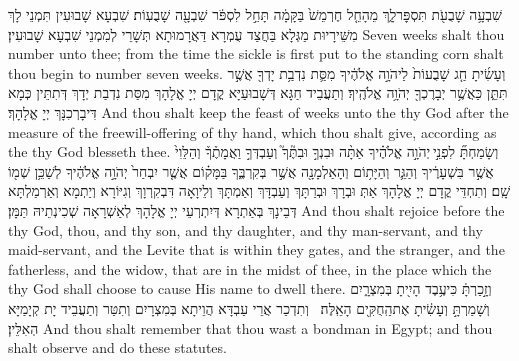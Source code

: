 {שִׁבְעָ֥ה שָׁבֻעֹ֖ת תִּסְפׇּר\maqqaf לָ֑ךְ מֵהָחֵ֤ל חֶרְמֵשׁ֙ בַּקָּמָ֔ה תָּחֵ֣ל לִסְפֹּ֔ר שִׁבְעָ֖ה שָׁבֻעֽוֹת׃}
{שִׁבְעָא שָׁבוּעִין תִּמְנֵי לָךְ מִשֵּׁירָיוּת מַגְּלָא בַּחֲצַד עֻמְרָא דַּאֲרָמוּתָא תְּשָׁרֵי לְמִמְנֵי שִׁבְעָא שָׁבוּעִין׃}
{Seven weeks shalt thou number unto thee; from the time the sickle is first put to the standing corn shalt thou begin to number seven weeks.}{}
{וְעָשִׂ֜יתָ חַ֤ג שָׁבֻעוֹת֙ לַיהֹוָ֣ה אֱלֹהֶ֔יךָ מִסַּ֛ת נִדְבַ֥ת יָדְךָ֖ אֲשֶׁ֣ר תִּתֵּ֑ן כַּאֲשֶׁ֥ר יְבָרֶכְךָ֖ יְהֹוָ֥ה אֱלֹהֶֽיךָ׃}
{וְתַעֲבֵיד חַגָּא דְּשָׁבוּעַיָּא קֳדָם יְיָ אֱלָהָךְ מִסַּת נִדְבַת יְדָךְ דְּתִתֵּין כְּמָא דִּיבָרְכִנָּךְ יְיָ אֱלָהָךְ׃}
{And thou shalt keep the feast of weeks unto the \lord\space thy God after the measure of the freewill-offering of thy hand, which thou shalt give, according as the \lord\space thy God blesseth thee.}{}
{וְשָׂמַחְתָּ֞ לִפְנֵ֣י \legarmeh  יְהֹוָ֣ה אֱלֹהֶ֗יךָ אַתָּ֨ה וּבִנְךָ֣ וּבִתֶּ֘ךָ֮ וְעַבְדְּךָ֣ וַאֲמָתֶ֒ךָ֒ וְהַלֵּוִי֙ אֲשֶׁ֣ר בִּשְׁעָרֶ֔יךָ וְהַגֵּ֛ר וְהַיָּת֥וֹם וְהָאַלְמָנָ֖ה אֲשֶׁ֣ר בְּקִרְבֶּ֑ךָ בַּמָּק֗וֹם אֲשֶׁ֤ר יִבְחַר֙ יְהֹוָ֣ה אֱלֹהֶ֔יךָ לְשַׁכֵּ֥ן שְׁמ֖וֹ שָֽׁם׃}
{וְתִחְדֵּי קֳדָם יְיָ אֱלָהָךְ אַתְּ וּבְרָךְ וּבְרַתָּךְ וְעַבְדָּךְ וְאַמְתָּךְ וְלֵיוָאָה דִּבְקִרְוָךְ וְגִיּוֹרָא וְיַתְמָא וְאַרְמַלְתָּא דְּבֵינָךְ בְּאַתְרָא דְּיִתְרְעֵי יְיָ אֱלָהָךְ לְאַשְׁרָאָה שְׁכִינְתֵיהּ תַּמָּן׃}
{And thou shalt rejoice before the \lord\space thy God, thou, and thy son, and thy daughter, and thy man-servant, and thy maid-servant, and the Levite that is within they gates, and the stranger, and the fatherless, and the widow, that are in the midst of thee, in the place which the \lord\space thy God shall choose to cause His name to dwell there.}{}
{וְזָ֣כַרְתָּ֔ כִּי\maqqaf עֶ֥בֶד הָיִ֖יתָ בְּמִצְרָ֑יִם וְשָׁמַרְתָּ֣ וְעָשִׂ֔יתָ אֶת\maqqaf הַֽחֻקִּ֖ים הָאֵֽלֶּה׃ \petucha }
{וְתִדְכַר אֲרֵי עַבְדָּא הֲוֵיתָא בְּמִצְרָיִם וְתִטַּר וְתַעֲבֵיד יָת קְיָמַיָּא הְאִלֵּין׃}
{And thou shalt remember that thou wast a bondman in Egypt; and thou shalt observe and do these statutes.}{}

